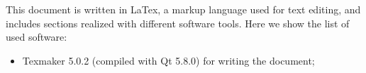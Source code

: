 This document is written in LaTex, a markup language used for text editing, and includes sections realized with different software tools. Here we show the list of used software:
\begin{itemize}
	\item Texmaker 5.0.2 (compiled with Qt 5.8.0) for writing the document;
\end{itemize}
